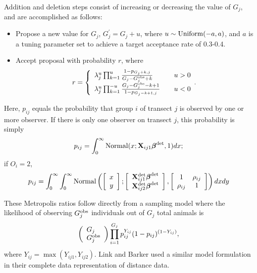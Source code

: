 \documentclass[10pt]{article}
\begin{document}
Addition and deletion steps consist of increasing or decreasing the value of $G_j$, and are accomplished as follows:
\begin{itemize}
    \item Propose a new value for $G_j$, $G_j^\prime=G_j+u$, where
    $u\sim {\rm Uniform}(-a,a)$, and $a$ is a tuning parameter set to achieve a target acceptance rate of 0.3-0.4.
    \item Accept proposal with probability $r$, where
    $$
    r= \left\{ \begin{array}{lll}
				\lambda_j^u \prod_{k=1}^u
                \frac{1-p_{G_j+k,j}}{G_j-G_j^{\rm obs}+k}& & u>0\\
			    \lambda_j^u \prod_{k=1}^{-u}
                \frac{G_j-G_j^{\rm obs}-k+1}{
                1-p_{G_j-k+1,j}}& & u<0
		\end{array}. \right.
    $$
\end{itemize}
    Here, $p_{ij}$ equals the probability that group $i$ of transect $j$ is observed by one or more observer.  If there is only one observer on transect $j$, this probability is simply $$
      p_{ij} = \int_0^\infty {\rm Normal}(x;{\bf X}_{ij1}\boldsymbol{\beta}^{\rm det},1)dx;
    $$
    if $O_i=2$,
    $$
      p_{ij} = \int_0^\infty \int_0^\infty {\rm Normal}
        \left( \left[ \begin{array}{c}
				x\\
				y
		\end{array} \right]; \left[
        \begin{array}{c}
				{\bf X}_{ij1}^{\rm det} \boldsymbol{\beta}^{\rm
                det}\\
				{\bf X}_{ij2}^{\rm det} \boldsymbol{\beta}^{\rm
                det}
		\end{array}\right],
        \left[ \begin{array}{cc}
            1 & \rho_{ij} \\
            \rho_{ij} & 1
        \end{array} \right]
        \right) dx dy
    $$

These Metropolis ratios follow directly from a sampling model where the likelihood of observing $G_j^{\rm obs}$ individuals out of $G_j$ total animals is
$$
\left( \begin{array}{l}
G_j \\
G_j^{\rm obs}
\end{array} \right)
\prod_{i=1}^{G_j} p_{ij}^{Y_{ij}} (1-p_{ij})^{(1-Y_{ij})},
$$
where $Y_{ij}=\max(Y_{ij1},Y_{ij2})$.  Link and Barker \cite{LinkBarker2010} used a similar model formulation in their complete data representation of distance data.
\end{document}
